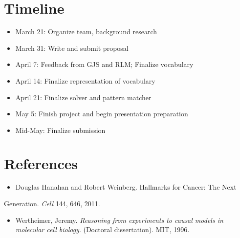 \documentclass[11pt]{article}
\begin{document}
\section{Timeline
}
\label{sec-3}
\begin{itemize}
\item March 21: Organize team, background research
\item March 31: Write and submit proposal
\item April 7: Feedback from GJS and RLM; Finalize vocabulary
\item April 14: Finalize representation of vocabulary
\item April 21: Finalize solver and pattern matcher
\item May 5: Finish project and begin presentation preparation
\item Mid-May: Finalize submission
\end{itemize}

\section{References
}
\label{sec-4}
\begin{itemize}
\item Douglas Hanahan and Robert Weinberg. Hallmarks for Cancer: The Next
\end{itemize}
Generation. \emph{Cell} 144, 646, 2011.
\begin{itemize}
\item Wertheimer, Jeremy. \emph{Reasoning from experiments to causal models in molecular cell biology}. (Doctoral dissertation). MIT, 1996.
\end{itemize}
\end{document}
